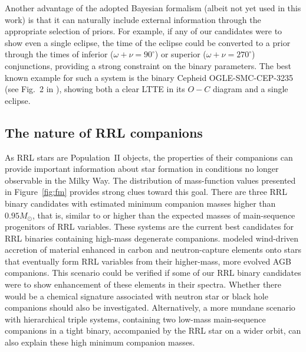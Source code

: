\documentclass[twocolumn,times]{aastex63}
\begin{document}
Another advantage of the adopted Bayesian formalism (albeit not yet used in this work) is that it can naturally include
external information through the appropriate selection of priors. For example, if any of our candidates were to show even a single eclipse,
the time of the eclipse could be converted to a prior through the times of inferior ($\omega + \nu=90^\circ$) or superior
($\omega + \nu=270^\circ$) conjunctions, providing a strong constraint on the binary parameters. The best known
example for such a system is the binary Cepheid OGLE-SMC-CEP-3235 (see Fig.~2 in \citealt{2015AcA....65..341U}),
showing both a clear LTTE in its $O-C$ diagram and a single eclipse.

\subsection{The nature of RRL companions} \label{subsec:comp}

As RRL stars are Population~II objects, the properties of their companions can provide important information about star formation
in conditions no longer observable in the Milky Way.
The distribution of mass-function values presented in Figure~\ref{fig:fm} provides strong clues toward this goal.
There are three RRL binary candidates with estimated minimum companion masses higher than $0.95M_\odot$, that is,
similar to or higher than the expected masses of main-sequence progenitors of RRL variables. These systems are the current
best candidates for RRL binaries containing high-mass degenerate companions.
\citet{2013MNRAS.435..698S} modeled wind-driven accretion of material enhanced in carbon and neutron-capture elements
onto stars that eventually form RRL variables from their higher-mass, more evolved AGB companions.
This scenario could be verified if some of our RRL binary candidates were to show enhancement of these elements in their spectra.
Whether there would be a chemical signature associated with neutron star or black hole companions should also be investigated.
Alternatively, a more mundane scenario with hierarchical triple systems, containing two low-mass main-sequence companions in a tight binary,
accompanied by the RRL star on a wider orbit, can also explain these high minimum companion masses.
\end{document}

